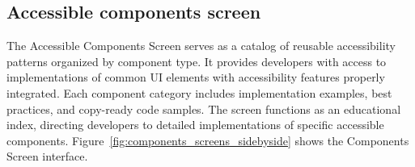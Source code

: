 \subsection{Accessible components screen}

The Accessible Components Screen serves as a catalog of reusable accessibility patterns organized by component type. It provides developers with access to implementations of common UI elements with accessibility features properly integrated. Each component category includes implementation examples, best practices, and copy-ready code samples. The screen functions as an educational index, directing developers to detailed implementations of specific accessible components. Figure~\ref{fig:components_screens_sidebyside} shows the Components Screen interface.

\begin{figure}[ht]
    \centering
    \begin{subfigure}[b]{0.48\textwidth}
        \centering

\end{subfigure}
\end{figure}
